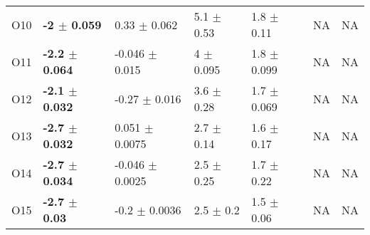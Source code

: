 \begin{table}[!htb]
\begin{tabular}{lllllll}
        O10    &  \textbf{-2    $\pm$  0.059}  &  0.33    $\pm$  0.062   &  5.1  $\pm$  0.53   &  1.8  $\pm$  0.11   &  NA      & NA \\
        O11    &  \textbf{-2.2  $\pm$  0.064}  &  -0.046  $\pm$  0.015   &  4    $\pm$  0.095  &  1.8  $\pm$  0.099  &  NA      & NA \\
        O12    &  \textbf{-2.1  $\pm$  0.032}  &  -0.27   $\pm$  0.016   &  3.6  $\pm$  0.28   &  1.7  $\pm$  0.069  &  NA      & NA \\
        O13    &  \textbf{-2.7  $\pm$  0.032}  &  0.051   $\pm$  0.0075  &  2.7  $\pm$  0.14   &  1.6  $\pm$  0.17   &  NA      & NA \\
        O14    &  \textbf{-2.7  $\pm$  0.034}  &  -0.046  $\pm$  0.0025  &  2.5  $\pm$  0.25   &  1.7  $\pm$  0.22   &  NA      & NA \\
        O15    &  \textbf{-2.7  $\pm$  0.03 }  &  -0.2    $\pm$  0.0036  &  2.5  $\pm$  0.2    &  1.5  $\pm$  0.06   &  NA      & NA \\
        \bottomrule
    \end{tabular}
\end{table}
